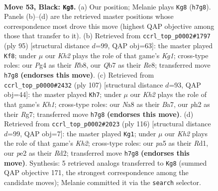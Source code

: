 \documentclass[11pt]{article}
\begin{document}
\clearpage

\begin{figure}[p]\centering
\begin{subfigure}{0.46\textwidth}\centering
\resizebox{\linewidth}{!}{%
\newchessgame
\chessboard[
  setfen={nr6/1q2br1k/p3n3/P1p2p1p/3p1Pp1/1P4P1/QRNBP2P/2RN2K1 b - - 23 53},
  showmover=false,
  pgfstyle=straightmove, color=movearrow, markmove={h7-g8}
]}
\caption{}
\end{subfigure}\hfill
\begin{subfigure}{0.46\textwidth}\centering
\resizebox{\linewidth}{!}{%
\newchessgame
\chessboard[
  setfen={1r2r1k1/p2b1n2/P1p2qp1/2Pp1p1p/1p3P2/1P1BPN1P/3QR1P1/2R4K b - - 26 48},
  showmover=false,
  pgfstyle=straightmove, color=movearrow, markmove={g8-f8}
]}
\caption{}
\end{subfigure}
\\[4pt]
\begin{subfigure}{0.46\textwidth}\centering
\resizebox{\linewidth}{!}{%
\newchessgame
\chessboard[
  setfen={3r3k/b4pr1/1nq3p1/4pPPp/1Pp1P2P/p1PpNQ2/P2B2RK/4R3 b - - 45 54},
  showmover=false,
  pgfstyle=straightmove, color=movearrow, markmove={h8-h7}
]}
\caption{}
\end{subfigure}\hfill
\begin{subfigure}{0.46\textwidth}\centering
\resizebox{\linewidth}{!}{%
\newchessgame
\chessboard[
  setfen={r5k1/1b3p2/1q1r2p1/1Pnp3p/pQpN3P/P3P1PB/3R1P1K/3R4 w - - 59 59},
  showmover=false,
  pgfstyle=straightmove, color=movearrow, markmove={h2-g1}
]}
\caption{}
\end{subfigure}
\caption{\textbf{Move 53, Black: \texttt{Kg8}.} (a) Our position; Melanie plays \texttt{Kg8} (\texttt{h7g8}). Panels (b)--(d) are the retrieved master positions whose correspondence most drove this move (highest QAP objective among those that transfer to it). (b) Retrieved from \texttt{ccrl\_top\_p0002\#1797} (ply 95) [structural distance $d$=99, QAP obj=63]: the master played \texttt{Kf8}; under $\mu$ our \emph{Kh2} plays the role of that game's \emph{Kg1}; cross-type roles: our \emph{P}g4 as their \emph{R}b8, our \emph{Q}b7 as their \emph{R}e8; transferred move \texttt{h7g8} \textbf{(endorses this move)}. (c) Retrieved from \texttt{ccrl\_top\_p0000\#2432} (ply 107) [structural distance $d$=93, QAP obj=44]: the master played \texttt{Kh7}; under $\mu$ our \emph{Kh2} plays the role of that game's \emph{Kh1}; cross-type roles: our \emph{N}a8 as their \emph{B}a7, our \emph{p}h2 as their \emph{R}g7; transferred move \texttt{h7g8} \textbf{(endorses this move)}. (d) Retrieved from \texttt{ccrl\_top\_p0002\#2023} (ply 116) [structural distance $d$=99, QAP obj=7]: the master played \texttt{Kg1}; under $\mu$ our \emph{Kh2} plays the role of that game's \emph{Kh2}; cross-type roles: our \emph{p}a5 as their \emph{R}d1, our \emph{p}e2 as their \emph{R}d2; transferred move \texttt{h7g8} \textbf{(endorses this move)}. Synthesis: 5 retrieved analogs transferred to \texttt{Kg8} (summed QAP objective 171, the strongest correspondence among the candidate moves); Melanie committed it via the \texttt{search} selector.}
\label{fig:thought-m105}
\end{figure}
\end{document}
